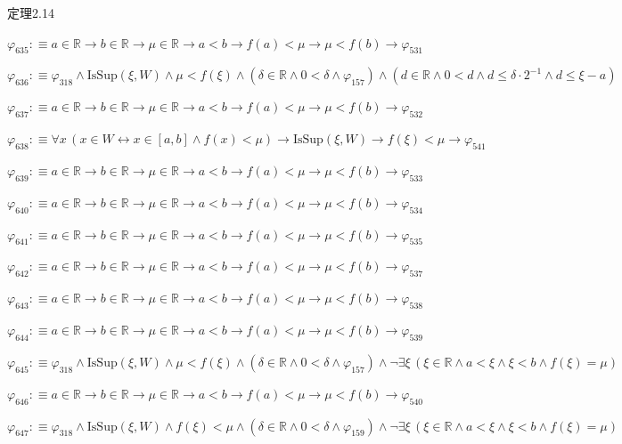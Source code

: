 \begin{fullproof}{定理2.14}
\begin{abbrevlist}
\item $\varphi_{635} :\equiv a \in \mathbb{R} \to b \in \mathbb{R} \to \mu \in \mathbb{R} \to a < b \to f(a) < \mu \to \mu < f(b) \to \varphi_{531}$
\item $\varphi_{636} :\equiv \varphi_{318} \land \mathrm{IsSup}(\xi,W) \land \mu < f(\xi) \land (\delta \in \mathbb{R} \land 0 < \delta \land \varphi_{157}) \land (d \in \mathbb{R} \land 0 < d \land d \leq \delta \cdot 2^{-1} \land d \leq \xi - a)$
\item $\varphi_{637} :\equiv a \in \mathbb{R} \to b \in \mathbb{R} \to \mu \in \mathbb{R} \to a < b \to f(a) < \mu \to \mu < f(b) \to \varphi_{532}$
\item $\varphi_{638} :\equiv \forall x\,(x \in W \leftrightarrow x \in [a,b] \land f(x) < \mu) \to \mathrm{IsSup}(\xi,W) \to f(\xi) < \mu \to \varphi_{541}$
\item $\varphi_{639} :\equiv a \in \mathbb{R} \to b \in \mathbb{R} \to \mu \in \mathbb{R} \to a < b \to f(a) < \mu \to \mu < f(b) \to \varphi_{533}$
\item $\varphi_{640} :\equiv a \in \mathbb{R} \to b \in \mathbb{R} \to \mu \in \mathbb{R} \to a < b \to f(a) < \mu \to \mu < f(b) \to \varphi_{534}$
\item $\varphi_{641} :\equiv a \in \mathbb{R} \to b \in \mathbb{R} \to \mu \in \mathbb{R} \to a < b \to f(a) < \mu \to \mu < f(b) \to \varphi_{535}$
\item $\varphi_{642} :\equiv a \in \mathbb{R} \to b \in \mathbb{R} \to \mu \in \mathbb{R} \to a < b \to f(a) < \mu \to \mu < f(b) \to \varphi_{537}$
\item $\varphi_{643} :\equiv a \in \mathbb{R} \to b \in \mathbb{R} \to \mu \in \mathbb{R} \to a < b \to f(a) < \mu \to \mu < f(b) \to \varphi_{538}$
\item $\varphi_{644} :\equiv a \in \mathbb{R} \to b \in \mathbb{R} \to \mu \in \mathbb{R} \to a < b \to f(a) < \mu \to \mu < f(b) \to \varphi_{539}$
\item $\varphi_{645} :\equiv \varphi_{318} \land \mathrm{IsSup}(\xi,W) \land \mu < f(\xi) \land (\delta \in \mathbb{R} \land 0 < \delta \land \varphi_{157}) \land \neg \exists \xi\,(\xi \in \mathbb{R} \land a < \xi \land \xi < b \land f(\xi) = \mu)$
\item $\varphi_{646} :\equiv a \in \mathbb{R} \to b \in \mathbb{R} \to \mu \in \mathbb{R} \to a < b \to f(a) < \mu \to \mu < f(b) \to \varphi_{540}$
\item $\varphi_{647} :\equiv \varphi_{318} \land \mathrm{IsSup}(\xi,W) \land f(\xi) < \mu \land (\delta \in \mathbb{R} \land 0 < \delta \land \varphi_{159}) \land \neg \exists \xi\,(\xi \in \mathbb{R} \land a < \xi \land \xi < b \land f(\xi) = \mu)$

\end{abbrevlist}
\end{fullproof}
